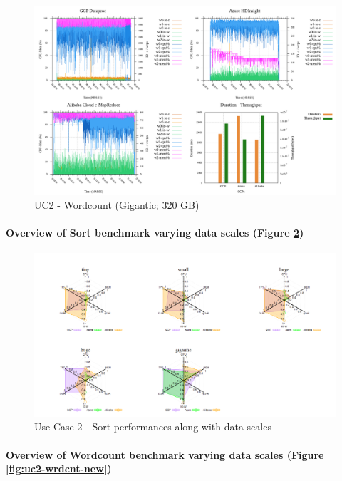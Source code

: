 \documentclass[review]{elsarticle}
\begin{document}
\begin{figure}[p]
	\caption{UC2 - Wordcount (Gigantic; 320 GB)}
	\label{fig:uc2-wrdcnt-g-cmidt}
	\includegraphics[width=\textwidth]{uc2-wrdcnt-g-cmidt}
	\centering
\end{figure}

\paragraph{Overview of Sort benchmark varying data scales (Figure \ref{fig:uc2-srt-new})}

\begin{figure}[p]
	\caption{Use Case 2 - Sort performances along with data scales}
	\label{fig:uc2-srt-new}
	\includegraphics[width=\textwidth]{uc2-srt-new}
	\centering
\end{figure}

\paragraph{Overview of Wordcount benchmark varying data scales (Figure \ref{fig:uc2-wrdcnt-new})}
\end{document}
